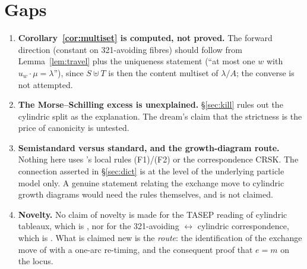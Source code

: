 \documentclass[11pt]{article}
\theoremstyle{plain}
\theoremstyle{definition}
\begin{document}
\section{Gaps}\label{sec:gaps}

\begin{enumerate}
\item \textbf{Corollary~\ref{cor:multiset} is computed, not proved.} The forward direction
(constant on 321-avoiding fibres) should follow from Lemma~\ref{lem:travel} plus the uniqueness
statement \cite[l.1723]{Lam2006} (``at most one $w$ with $u_w\cdot\mu=\lambda$''), since
$S\uplus T$ is then the content multiset of $\lambda/A$; the converse is not attempted.
\item \textbf{The Morse--Schilling excess is unexplained.} \S\ref{sec:kill} rules out the
cylindric split as the explanation. The dream's claim that the strictness is the price of
canonicity is untested.
\item \textbf{Semistandard versus standard, and the growth-diagram route.} Nothing here uses
\cite{ElizaldeFPSAC}'s local rules (F1)/(F2) or the correspondence CRSK. The connection
asserted in \S\ref{sec:dict} is at the level of the underlying particle model only. A genuine
statement relating the exchange move to cylindric growth diagrams would need the rules
themselves, and is not claimed.
\item \textbf{Novelty.} No claim of novelty is made for the TASEP reading of cylindric
tableaux, which is \cite{Elizalde2507}, nor for the 321-avoiding $\leftrightarrow$ cylindric
correspondence, which is \cite{Lam2006}. What is claimed new is the \emph{route}: the
identification of the exchange move of \cite{ClioExch} with a one-arc re-timing, and the
consequent proof that $e=m$ on the locus.
\end{enumerate}
\end{document}
